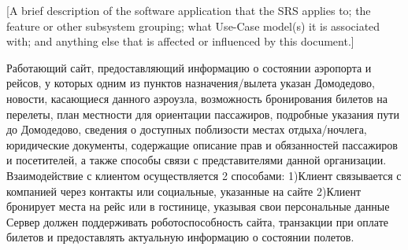 [A brief description of the software application 
that the SRS applies to; the feature or other 
subsystem grouping; what Use-Case model(s) it 
is associated with;  and anything else that is 
affected or influenced by this document.]

Работающий сайт, предоставляющий информацию о состоянии аэропорта и рейсов, у которых одним из пунктов назначения/вылета указан Домодедово, 
новости, касающиеся данного аэроузла, возможность бронирования билетов на перелеты, план местности для ориентации пассажиров,
подробные указания пути до Домодедово, сведения о доступных поблизости местах отдыха/ночлега, юридические документы, содержащие описание 
прав и обязанностей пассажиров и посетителей, а также способы связи с представителями данной организации.
Взаимодействие с клиентом осуществляется 2 способами: 
1)Клиент связывается с компанией через контакты или социальные, указанные на сайте
2)Клиент бронирует места на рейс или в гостинице, указывая свои персональные данные
Сервер должен поддерживать роботоспособность сайта, транзакции при оплате билетов и предоставлять актуальную информацию о состоянии полетов.
